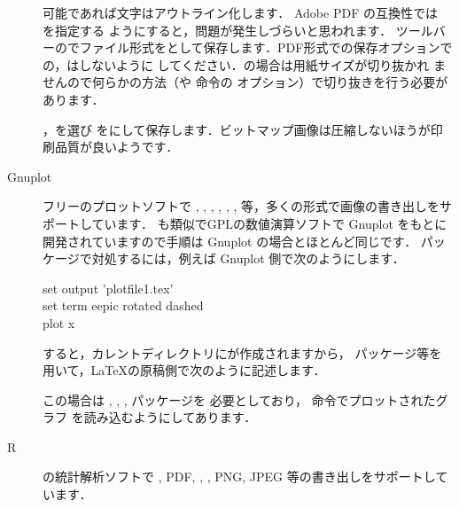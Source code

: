 \begin{description}
\item[]
  可能であれば文字はアウトライン化します．
  Adobe PDF の互換性では を指定する
  ようにすると，問題が発生しづらいと思われます．
  ツールバーのでファイル形式をとして保存します．PDF形式での保存オプションでの，はしないように
  してください．の場合は用紙サイズが切り抜かれ
  ませんので何らかの方法（や 
  命令の  オプション）で切り抜きを行う必要があります．
\item[]
  ，を選び
  をにして保存します．ビットマップ画像は圧縮しないほうが印
  刷品質が良いようです．
\item[Gnuplot] フリーのプロットソフトで \PS, , ,
  , , \Prog[MetaFont]{\MF},
  \Prog[MetaPost]{\MP}等，多くの形式で画像の書き出しをサポートしています．
  も類似でGPLの数値演算ソフトで Gnuplot をもとに
  開発されていますので手順は Gnuplot の場合とほとんど同じです．
  パッケージで対処するには，例えば Gnuplot 側で次のようにします．

\begin{InText}
set output 'plotfile1.tex'\\
set term eepic rotated dashed\\
plot x
\end{InText}

すると，カレントディレクトリにが作成されますから，
パッケージ等を用いて，\LaTeX の原稿側で次のように記述します．


  この場合は , , , パッケージを
  必要としており， 命令でプロットされたグラフ 
  を読み込むようにしてあります．
 \item[R] 
  の統計解析ソフトで \PS, PDF, , , 
  PNG, JPEG 等の書き出しをサポートしています．


\end{description}
